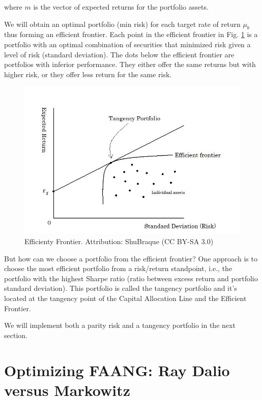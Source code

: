 \documentclass[]{book}
\theoremstyle{definition}
\theoremstyle{definition}
\theoremstyle{definition}
\theoremstyle{remark}
\begin{document}
where \(m\) is the vector of expected returns for the portfolio assets.

We will obtain an optimal portfolio (min risk) for each target rate of
return \(\mu_b\) thus forming an efficient frontier. Each point in the
efficient frontier in Fig. \ref{fig:efficientport} is a portfolio with
an optimal combination of securities that minimized risk given a level
of risk (standard deviation). The dots below the efficient frontier are
portfolios with inferior performance. They either offer the same returns
but with higher risk, or they offer less return for the same risk.

\begin{figure}[H]

{\centering \includegraphics[width=1\linewidth]{./chapters/RiskParity/efficientport} 

}

\caption{Efficienty Frontier. Attribution: ShuBraque (CC BY-SA 3.0)}\label{fig:efficientport}
\end{figure}

But how can we choose a portfolio from the efficient frontier? One
approach is to choose the most efficient portfolio from a risk/return
standpoint, i.e., the portfolio with the highest Sharpe ratio (ratio
between excess return and portfolio standard deviation). This portfolio
is called the tangency portfolio and it's located at the tangency point
of the Capital Allocation Line and the Efficient Frontier.

We will implement both a parity risk and a tangency portfolio in the
next section.

\section{Optimizing FAANG: Ray Dalio versus
Markowitz}\label{optimizing-faang-ray-dalio-versus-markowitz}
\end{document}
